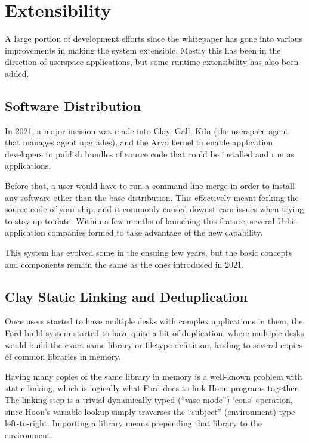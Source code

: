 \documentclass[twoside]{article}
\begin{document}
\section{Extensibility}

A large portion of development efforts since the whitepaper has gone into various improvements in making the system extensible.  Mostly this has been in the direction of userspace applications, but some runtime extensibility has also been added.

\subsection{Software Distribution}

In 2021, a major incision was made into Clay, Gall, Kiln (the userspace agent that manages agent upgrades), and the Arvo kernel to enable application developers to publish bundles of source code that could be installed and run as applications.

Before that, a user would have to run a command-line merge in order to install any software other than the base distribution.  This effectively meant forking the source code of your ship, and it commonly caused downstream issues when trying to stay up to date.  Within a few months of launching this feature, several Urbit application companies formed to take advantage of the new capability.

This system has evolved some in the ensuing few years, but the basic concepts and components remain the same as the ones introduced in 2021.

\subsection{Clay Static Linking and Deduplication}

Once users started to have multiple desks with complex applications in them, the Ford build system started to have quite a bit of duplication, where multiple desks would build the exact same library or filetype definition, leading to several copies of common libraries in memory.

Having many copies of the same library in memory is a well-known problem with static linking, which is logically what Ford does to link Hoon programs together.  The linking step is a trivial dynamically typed (``vase-mode'') `cons' operation, since Hoon's variable lookup simply traverses the ``subject'' (environment) type left-to-right.  Importing a library means prepending that library to the environment.
\end{document}
